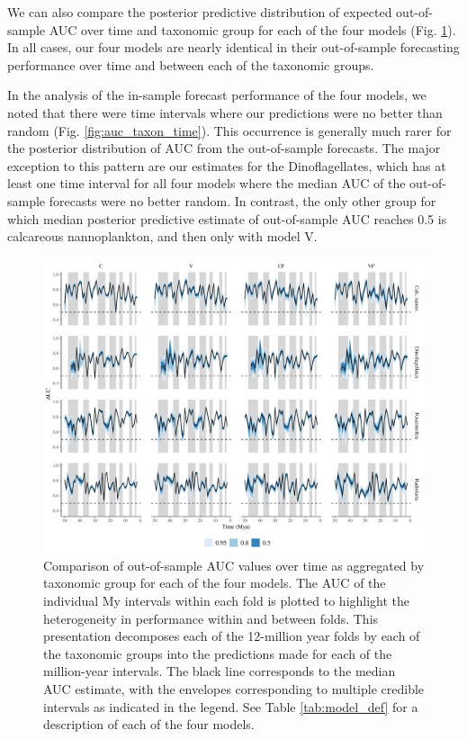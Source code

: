 \documentclass[12pt,letterpaper]{article}
\begin{document}
\begin{refsection}
We can also compare the posterior predictive distribution of expected out-of-sample AUC over time and taxonomic group for each of the four models (Fig. \ref{fig:fold_auc_taxon_time}). In all cases, our four models are nearly identical in their out-of-sample forecasting performance over time and between each of the taxonomic groups. 

In the analysis of the in-sample forecast performance of the four models, we noted that there were time intervals where our predictions were no better than random (Fig. \ref{fig:auc_taxon_time}). This occurrence is generally much rarer for the posterior distribution of AUC from the out-of-sample forecasts. The major exception to this pattern are our estimates for the Dinoflagellates, which has at least one time interval for all four models where the median AUC of the out-of-sample forecasts were no better random. In contrast, the only other group for which median posterior predictive estimate of out-of-sample AUC reaches 0.5 is calcareous nannoplankton, and then only with model V.
\begin{figure}[ht]
 \centering
 \includegraphics[width=\textwidth,height=0.5\textheight,keepaspectratio=true]{../results/figure/fold_auc_taxon_time_full}
 \caption{Comparison of out-of-sample AUC values over time as aggregated by taxonomic group for each of the four models. The AUC of the individual My intervals within each fold is plotted to highlight the heterogeneity in performance within and between folds. This presentation decomposes each of the 12-million year folds by each of the taxonomic groups into the predictions made for each of the million-year intervals. The black line corresponds to the median AUC estimate, with the envelopes corresponding to multiple credible intervals as indicated in the legend. See Table \ref{tab:model_def} for a description of each of the four models.}
 \label{fig:fold_auc_taxon_time}
\end{figure}



\end{refsection}
\end{document}
